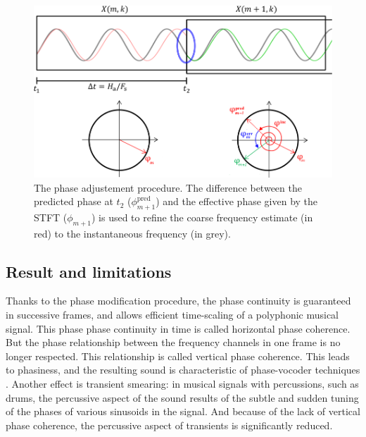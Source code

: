 \documentclass[letterpaper]{article}
\theoremstyle{definition}
\theoremstyle{remark}
\theoremstyle{plain}
\begin{document}
\begin{figure}
\includegraphics[width=\linewidth]{phase-unwrapping.png}
\caption{The phase adjustement procedure. The difference between the predicted
phase at \(t_2\) (\(\phi^{\text{pred}}_{m+1}\)) and the effective phase given by
the STFT (\(\phi_{m+1}\)) is used to refine the coarse frequency estimate (in
red) to the instantaneous frequency (in grey).}
\end{figure}

\subsection{Result and limitations}
Thanks to the phase modification procedure, the phase continuity is guaranteed
in successive frames, and allows efficient time-scaling of a polyphonic musical
signal. This phase phase continuity in time is called horizontal phase
coherence. But the phase relationship between the frequency channels in one
frame is no longer respected. This relationship is called vertical phase
coherence. This leads to phasiness, and the resulting sound is characteristic of
phase-vocoder techniques \citep{Laroche1999}. Another effect is transient
smearing: in musical signals with percussions, such as drums, the percussive
aspect of the sound results of the subtle and sudden tuning of the phases of
various sinusoids in the signal. And because of the lack of vertical phase
coherence, the percussive aspect of transients is significantly reduced.

\paragraph{}
\end{document}
